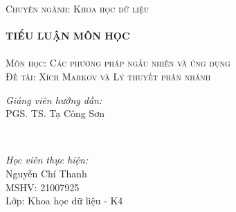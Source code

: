 \documentclass[14pt, a4paper]{article}
\numberwithin{equation}{section}
\numberwithin{figure}{section}
\theoremstyle{sltheorem}
\theoremstyle{soltheorem}
\numberwithin{dl}{section}
\numberwithin{md}{section}
\numberwithin{vd}{section}
\begin{document}
\begin{titlepage}
        \textsc{\Large Chuyên ngành: Khoa học dữ liệu}\\[0.5cm] %



        \HRule \\[0.4cm]
        { \huge \bfseries TIỂU LUẬN MÔN HỌC}\\[0.4cm] %
        \HRule \\[1.5cm]

        \textsc{\Large Môn học: Các phương pháp ngẫu nhiên và ứng dụng}\\[1cm] %


        \textsc{\Large Đề tài: Xích Markov và Lý thuyết phân nhánh}\\[2cm]


        \begin{minipage}{0.4\textwidth}
            \begin{flushleft} \large
            \emph{Giảng viên hướng dẫn:} \\
            PGS. TS. Tạ Công Sơn %
            \end{flushleft}
        \end{minipage}\\[0.5cm]

        \begin{minipage}{0.4\textwidth}
        \begin{flushleft} \large
        \emph{Học viên thực hiện:}\\
        Nguyễn Chí Thanh \\
        MSHV: 21007925 \\ %
        Lớp: Khoa học dữ liệu - K4
        \end{flushleft}
        \end{minipage}




\end{titlepage}
\end{document}

